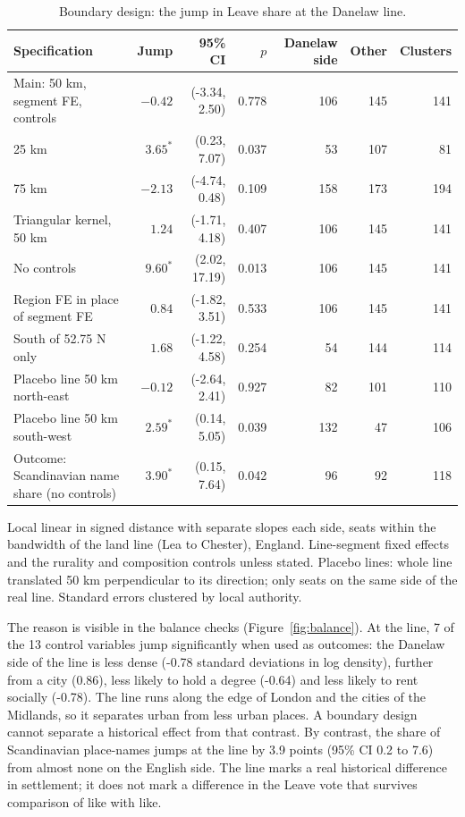 \documentclass[11pt,a4paper]{article}
\begin{document}
\begin{table}[tbp]\centering\scriptsize\caption{Boundary design: the jump in Leave share at the Danelaw line.}\label{tab:rd}\begin{tabular}{lrrrrrr}\toprule Specification & Jump & 95\% CI & $p$ & Danelaw side & Other & Clusters\\\midrule
Main: 50 km, segment FE, controls & $-0.42$ & (-3.34, 2.50) & 0.778 & 106 & 145 & 141\\
25 km & $3.65^{*}$ & (0.23, 7.07) & 0.037 & 53 & 107 & 81\\
75 km & $-2.13$ & (-4.74, 0.48) & 0.109 & 158 & 173 & 194\\
Triangular kernel, 50 km & $1.24$ & (-1.71, 4.18) & 0.407 & 106 & 145 & 141\\
No controls & $9.60^{*}$ & (2.02, 17.19) & 0.013 & 106 & 145 & 141\\
Region FE in place of segment FE & $0.84$ & (-1.82, 3.51) & 0.533 & 106 & 145 & 141\\
South of 52.75 N only & $1.68$ & (-1.22, 4.58) & 0.254 & 54 & 144 & 114\\
Placebo line 50 km north-east & $-0.12$ & (-2.64, 2.41) & 0.927 & 82 & 101 & 110\\
Placebo line 50 km south-west & $2.59^{*}$ & (0.14, 5.05) & 0.039 & 132 & 47 & 106\\
Outcome: Scandinavian name share (no controls) & $3.90^{*}$ & (0.15, 7.64) & 0.042 & 96 & 92 & 118\\
\bottomrule\end{tabular}\par\vspace{0.3em}\parbox{0.92\textwidth}{\scriptsize Local linear in signed distance with separate slopes each side, seats within the bandwidth of the land line (Lea to Chester), England. Line-segment fixed effects and the rurality and composition controls unless stated. Placebo lines: whole line translated 50 km perpendicular to its direction; only seats on the same side of the real line. Standard errors clustered by local authority.}\end{table}

The reason is visible in the balance checks (Figure~\ref{fig:balance}). At the line, 7 of the 13 control variables jump significantly when used as outcomes: the Danelaw side of the line is less dense (-0.78 standard deviations in log density), further from a city (0.86), less likely to hold a degree (-0.64) and less likely to rent socially (-0.78). The line runs along the edge of London and the cities of the Midlands, so it separates urban from less urban places. A boundary design cannot separate a historical effect from that contrast. By contrast, the share of Scandinavian place-names jumps at the line by 3.9 points (95\% CI 0.2 to 7.6) from almost none on the English side. The line marks a real historical difference in settlement; it does not mark a difference in the Leave vote that survives comparison of like with like.
\end{document}
